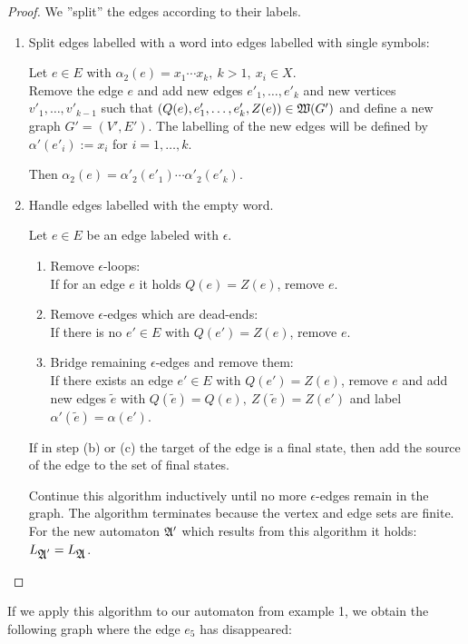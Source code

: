 \begin{proof}
We ''split'' the edges according to their labels.

\begin{enumerate}
  \item Split edges labelled with a word into edges labelled with single
  symbols:
  
  Let $e \in E$ with $\alpha_2(e) = x_1 \cdots x_k,\ k > 1,\ x_i \in X$.\\
  Remove the edge $e$ and add new edges $e'_1, \ldots, e'_k$ and new
  vertices $v'_1, \ldots, v'_{k-1}$ such that $(Q(e), e'_1, \ldots, e'_k,
  Z(e)) \in \mbox{$\mathfrak{W}({G'})$}$ and define a new graph $G' = (V', E')$. The labelling 
  of the new edges will be defined by $\alpha'(e'_i) := x_i$ for $i = 1, \ldots,
  k$.
  
  Then $\alpha_2(e) = \alpha'_2(e'_1) \cdots \alpha'_2(e'_k)$.
  
  \item Handle edges labelled with the empty word.
  
  Let $e \in E$ be an edge labeled with $\epsilon$.
  \begin{enumerate}
    \item Remove $\epsilon$-loops: \\
    If for an edge $e$ it holds $Q(e) = Z(e)$, remove $e$.
    \item Remove $\epsilon$-edges which are dead-ends: \\
    If there is no $e' \in E$ with $Q(e') = Z(e)$, remove $e$.
    \item Bridge remaining $\epsilon$-edges and remove them:\\
    If there exists an edge $e' \in E$ with $Q(e') = Z(e)$, remove $e$ and
    add new edges $\tilde{e}$ with $ Q(\tilde{e}) = Q(e),\ Z(\tilde{e}) =
    Z(e')$ and label $\alpha'(\tilde{e}) = \alpha(e')$.
  \end{enumerate}
  If in step (b) or (c) the target of the edge is a final state, then add the
  source of the edge to the set of final states.
  
  Continue this algorithm inductively until no more $\epsilon$-edges remain in
  the graph. The algorithm terminates because the vertex and edge sets are
  finite. For the new automaton $\mbox{$\mathfrak{A'}$}$ which results from this algorithm
  it holds: $L_{\mbox{$\mathfrak{A}$}'} = L_{\mbox{$\mathfrak{A}$}}$.
\end{enumerate}
\end{proof}

If we apply this algorithm to our automaton from example 1, we obtain the
following graph where the edge $e_5$ has disappeared:

